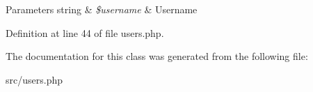 \begin{DoxyParams}[1]{\-Parameters}
string & {\em \$username} & \-Username \\
\hline
\end{DoxyParams}


\-Definition at line 44 of file users.\-php.




\-The documentation for this class was generated from the following file\-:\begin{DoxyCompactItemize}
\item 
src/users.\-php\end{DoxyCompactItemize}
